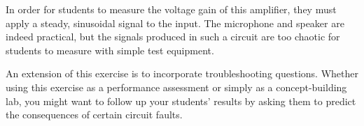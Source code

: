 In order for students to measure the voltage gain of this amplifier, they must apply a steady, sinusoidal signal to the input.  The microphone and speaker are indeed practical, but the signals produced in such a circuit are too chaotic for students to measure with simple test equipment.

An extension of this exercise is to incorporate troubleshooting questions.  Whether using this exercise as a performance assessment or simply as a concept-building lab, you might want to follow up your students' results by asking them to predict the consequences of certain circuit faults.




